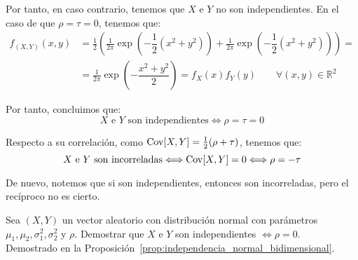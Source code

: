 \begin{ejercicio}
\begin{enumerate}
        Por tanto, en caso contrario, tenemos que $X$ e $Y$ no son independientes. En el caso de que $\rho=\tau=0$, tenemos que:
        \begin{align*}
            f_{(X,Y)}(x,y) &= \frac{1}{2}\left(\frac{1}{2\pi}\exp\left(-\dfrac{1}{2}(x^2 +y^2)\right)+\frac{1}{2\pi}\exp\left(-\dfrac{1}{2}(x^2 +y^2)\right)\right)
            =\\&= \frac{1}{2\pi}\exp\left(-\dfrac{x^2 +y^2}{2}\right)
            = f_X(x)f_Y(y)\qquad \forall (x,y)\in \mathbb{R}^2
        \end{align*}

        Por tanto, concluimos que:
        \begin{equation*}
            X\text{ e }Y\text{ son independientes} \Longleftrightarrow \rho=\tau=0
        \end{equation*}

        Respecto a su correlación, como $\operatorname{Cov}[X,Y]=\frac{1}{2}(\rho+\tau)$, tenemos que:
        \begin{equation*}
            X\text{ e }Y\text{ son incorreladas} \Longleftrightarrow \operatorname{Cov}[X,Y]=0 \Longleftrightarrow \rho=-\tau
        \end{equation*}

        De nuevo, notemos que si son independientes, entonces son incorreladas, pero el recíproco no es cierto.
    \end{enumerate}
\end{ejercicio}

\begin{ejercicio}
    Sea $(X,Y)$ un vector aleatorio con distribución normal con parámetros $\mu_1,\mu_2,\sigma_1^2,\sigma_2^2$ y $\rho$. Demostrar que $X$ e $Y$ son independientes $\Leftrightarrow \rho = 0$.\\

    Demostrado en la Proposición~\ref{prop:independencia_normal_bidimensional}.
\end{ejercicio}



